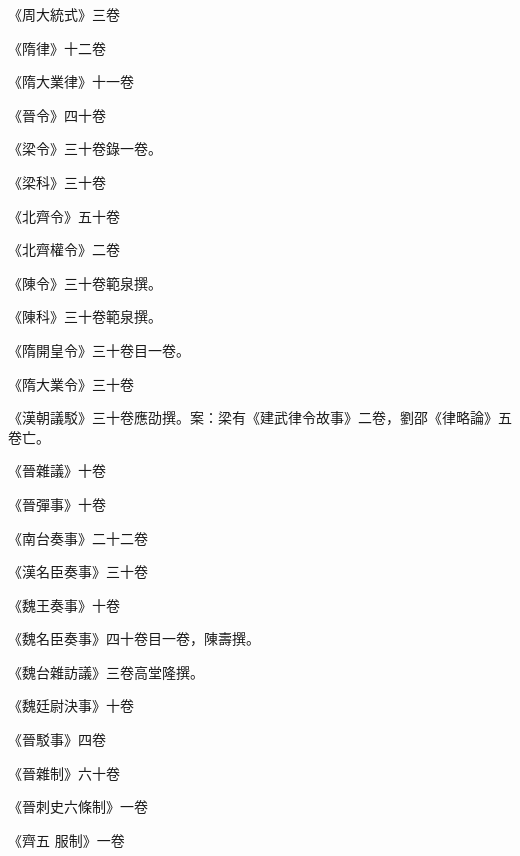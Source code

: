 \begin{pinyinscope}
 《周大統式》三卷



 《隋律》十二卷



 《隋大業律》十一卷



 《晉令》四十卷



 《梁令》三十卷錄一卷。



 《梁科》三十卷



 《北齊令》五十卷



 《北齊權令》二卷



 《陳令》三十卷範泉撰。



 《陳科》三十卷範泉撰。



 《隋開皇令》三十卷目一卷。



 《隋大業令》三十卷



 《漢朝議駁》三十卷應劭撰。案：梁有《建武律令故事》二卷，劉邵《律略論》五卷亡。



 《晉雜議》十卷



 《晉彈事》十卷



 《南台奏事》二十二卷



 《漢名臣奏事》三十卷



 《魏王奏事》十卷



 《魏名臣奏事》四十卷目一卷，陳壽撰。



 《魏台雜訪議》三卷高堂隆撰。



 《魏廷尉決事》十卷



 《晉駁事》四卷



 《晉雜制》六十卷



 《晉刺史六條制》一卷



 《齊五
 服制》一卷




\end{pinyinscope}
